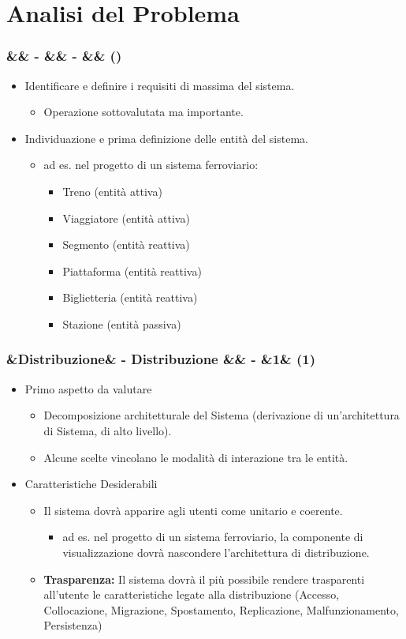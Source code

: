 \documentclass[slidestop,compress,blackandwhite]{beamer}
\newcommand{\itemB}[3]{
	\item \textbf{#1} #2 \vspace{#3}
}
\newcommand{\newtitle}[4]{
	#1 
	\ifx&#2&%
	\else
  		\large- #2
	\fi
	\ifx&#3&%
	\else
  		\normalsize- #3
	\fi
	\ifx&#4&%
	\else
  		\normalsize (#4)
	\fi
}
\newcommand{\newframe}[5]{
	\begin{frame}
		\frametitle{\newtitle{#1}{#2}{#3}{#4}}
		#5
	\end{frame}
}
\newcommand{\myitemize}[1]{
	\begin{itemize}\itemsep4pt
	#1
	\end{itemize}
}
\begin{document}
\section{Analisi del Problema}\label{analisis}
	\newframe{}{}{}{}{
		\myitemize {
			\item Identificare e definire i requisiti di massima del sistema.
				\myitemize{
					\item Operazione sottovalutata ma importante.
				}
			\item Individuazione e prima definizione delle entità del sistema.
				\myitemize {
					\item ad es. nel progetto di un sistema ferroviario:
						\myitemize{
							\item Treno (entità attiva)
							\item Viaggiatore (entità attiva)
							\item Segmento (entità reattiva)
							\item Piattaforma (entità reattiva)
							\item Biglietteria (entità reattiva)
							\item Stazione (entità passiva)
						}
				}
		}
	}
	
	\newframe{}{Distribuzione}{}{1}{
		\myitemize {
			\item Primo aspetto da valutare
				\myitemize {
					\item Decomposizione architetturale del Sistema (derivazione di un'architettura di Sistema, di alto livello).
					\item Alcune scelte vincolano le modalità di interazione tra le entità.
				}
			\item Caratteristiche Desiderabili
				\myitemize {
					\item \justifying Il sistema dovrà apparire agli utenti come unitario e coerente. 
						\myitemize{
							\item ad es. nel progetto di un sistema ferroviario, la componente di visualizzazione dovrà nascondere l'architettura di distribuzione. 
						}
					\itemB{Trasparenza:}{Il sistema dovrà il più possibile rendere trasparenti all'utente le caratteristiche legate alla distribuzione (Accesso, Collocazione, Migrazione, Spostamento, Replicazione, Malfunzionamento, Persistenza)}{0.1cm}
				}
		}
	}
	
\end{document}
